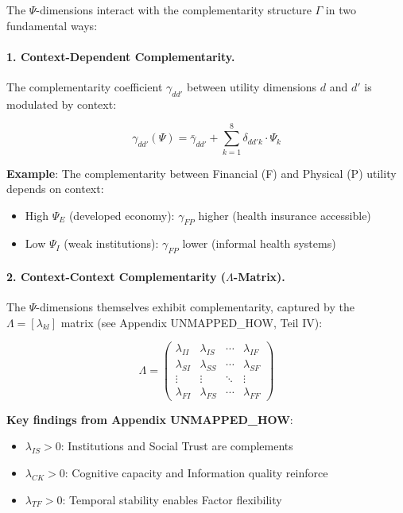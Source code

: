 The $\Psi$-dimensions interact with the complementarity structure $\Gamma$ in 
two fundamental ways:

\paragraph{1. Context-Dependent Complementarity.}

The complementarity coefficient $\gamma_{dd'}$ between utility dimensions $d$ 
and $d'$ is modulated by context:

\begin{equation}
\gamma_{dd'}(\Psi) = \bar{\gamma}_{dd'} + \sum_{k=1}^{8} \delta_{dd'k} \cdot \Psi_k
\label{eq:gamma-psi-modulation}
\end{equation}

\textbf{Example}: The complementarity between Financial (F) and Physical (P) 
utility depends on context:
\begin{itemize}
    \item High $\Psi_E$ (developed economy): $\gamma_{FP}$ higher (health insurance accessible)
    \item Low $\Psi_I$ (weak institutions): $\gamma_{FP}$ lower (informal health systems)
\end{itemize}

\paragraph{2. Context-Context Complementarity ($\Lambda$-Matrix).}

The $\Psi$-dimensions themselves exhibit complementarity, captured by the 
$\Lambda = [\lambda_{kl}]$ matrix (see Appendix UNMAPPED_HOW, Teil IV):

\begin{equation}
\Lambda = \begin{pmatrix}
\lambda_{II} & \lambda_{IS} & \cdots & \lambda_{IF} \\
\lambda_{SI} & \lambda_{SS} & \cdots & \lambda_{SF} \\
\vdots & \vdots & \ddots & \vdots \\
\lambda_{FI} & \lambda_{FS} & \cdots & \lambda_{FF}
\end{pmatrix}
\end{equation}

\textbf{Key findings from Appendix UNMAPPED_HOW}:
\begin{itemize}
    \item $\lambda_{IS} > 0$: Institutions and Social Trust are complements
    \item $\lambda_{CK} > 0$: Cognitive capacity and Information quality reinforce
    \item $\lambda_{TF} > 0$: Temporal stability enables Factor flexibility
\end{itemize}

